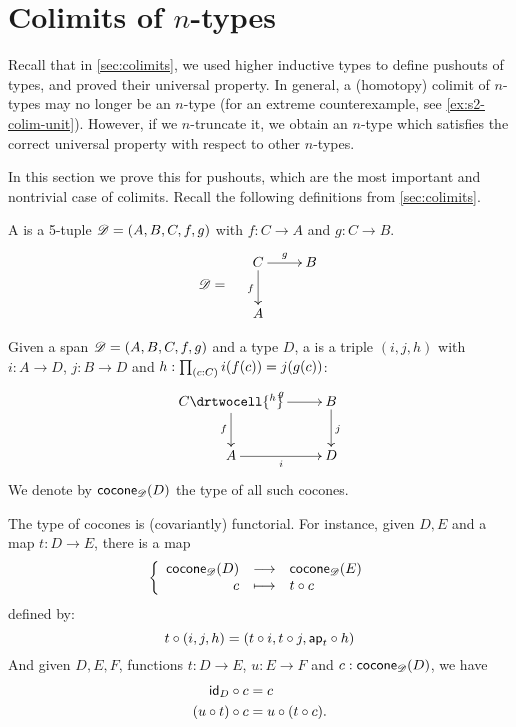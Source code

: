 %

\section{Colimits of \texorpdfstring{$n$}{n}-types}
\label{sec:pushouts}

Recall that in \cref{sec:colimits}, we used higher inductive types to define pushouts of types, and proved their universal property.
In general, a (homotopy) colimit of $n$-types may no longer be an $n$-type (for an extreme counterexample, see \cref{ex:s2-colim-unit}).
However, if we $n$-truncate it, we obtain an $n$-type which satisfies the correct universal property with respect to other $n$-types.

In this section we prove this for pushouts, which are the most important and nontrivial case of colimits.
Recall the following definitions from \cref{sec:colimits}.

\begin{defn}
  A  %
  is a 5-tuple $\Ddiag=(A,B,C,f,g)$ with %
  $f:C\to{}A$ and $g:C\to{}B$.
  \[\Ddiag=\quad\vcenter{\xymatrix{C \ar^g[r] \ar_f[d] & B \\ A & }}\]
\end{defn}

\begin{defn}
  Given a span $\Ddiag=(A,B,C,f,g)$ and a type $D$, a %
   is a triple $(i, j, h)$
  with $i:A\to{}D$, $j:B\to{}D$ and $h : \prd{c:C}i(f(c))=j(g(c))$:
  \[\uppercurveobject{{ }}\lowercurveobject{{ }}\twocellhead{{ }}
  \xymatrix{C \ar^g[r] \ar_f[d] \drtwocell{^h} & B \ar^j[d] \\ A \ar_i[r] & D
  }\]
  We denote by $\cocone{\Ddiag}{D}$ the type of all such cocones.
\end{defn}

The type of cocones is (covariantly) functorial.
For instance, given $D,E$ %
and a map $t:D\to{}E$, there is a map
  \[\function{\cocone{\Ddiag}{D}}{\cocone{\Ddiag}{E}}{c}{\composecocone{t}c}\]
  defined by:
  \[\composecocone{t}(i,j,h)=(t\circ{}i,t\circ{}j,\mapfunc{t}\circ{}h)\]
And given $D,E,F$, %
functions $t:D\to{}E$, $u:E\to{}F$ and $c:\cocone{\Ddiag}{D}$, we have
\begin{align}
  \composecocone{\idfunc[D]}c &= c \label{eq:composeconeid}\\
  \composecocone{(u\circ{}t)}c&=\composecocone{u}(\composecocone{t}c). \label{eq:composeconefunc}
\end{align}

